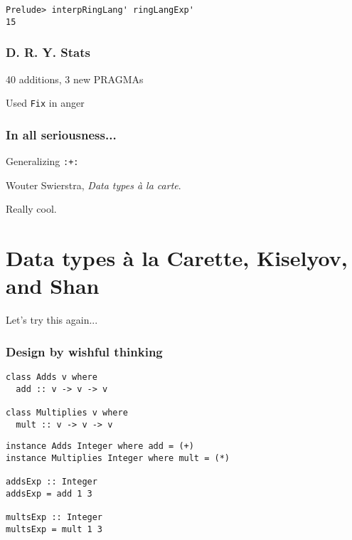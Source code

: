 \documentclass[pdf]{beamer}
\begin{document}
\begin{frame}[fragile]
\begin{lstlisting}
Prelude> interpRingLang' ringLangExp'
15
\end{lstlisting}
\end{frame}


\begin{frame}
  \frametitle{D. R. Y. Stats}
  \begin{center}
    40 additions, 3 new PRAGMAs
    
    \pause

    Used \texttt{Fix} in anger
  \end{center}
\end{frame}


\begin{frame}
  \frametitle{In all seriousness...}
  Generalizing \lstinline{:+:}

  Wouter Swierstra, \textit{Data types \`a la carte}.

  Really cool.
\end{frame}

\section{Data types \`a la Carette, Kiselyov, and Shan}

\begin{frame}
  Let's try this again...
\end{frame}

\begin{frame}[fragile]
  \frametitle{Design by wishful thinking}
\begin{lstlisting}
class Adds v where
  add :: v -> v -> v

class Multiplies v where
  mult :: v -> v -> v
\end{lstlisting}
\end{frame}

\begin{frame}[fragile]
\begin{lstlisting}
instance Adds Integer where add = (+)
instance Multiplies Integer where mult = (*)

addsExp :: Integer
addsExp = add 1 3

multsExp :: Integer
multsExp = mult 1 3
\end{lstlisting}
\end{frame}
\end{document}
